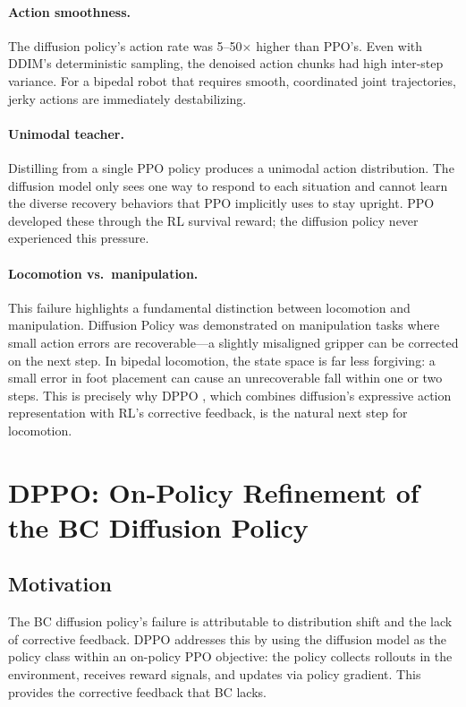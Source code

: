 \documentclass{article}
\begin{document}
\paragraph{Action smoothness.}
The diffusion policy's action rate was 5--50$\times$ higher than PPO's. Even with DDIM's deterministic sampling, the denoised action chunks had high inter-step variance. For a bipedal robot that requires smooth, coordinated joint trajectories, jerky actions are immediately destabilizing.

\paragraph{Unimodal teacher.}
Distilling from a single PPO policy produces a unimodal action distribution. The diffusion model only sees one way to respond to each situation and cannot learn the diverse recovery behaviors that PPO implicitly uses to stay upright. PPO developed these through the RL survival reward; the diffusion policy never experienced this pressure.

\paragraph{Locomotion vs.\ manipulation.}
This failure highlights a fundamental distinction between locomotion and manipulation. Diffusion Policy was demonstrated on manipulation tasks where small action errors are recoverable---a slightly misaligned gripper can be corrected on the next step. In bipedal locomotion, the state space is far less forgiving: a small error in foot placement can cause an unrecoverable fall within one or two steps. This is precisely why DPPO \citep{ren2024dppo}, which combines diffusion's expressive action representation with RL's corrective feedback, is the natural next step for locomotion.


\section{DPPO: On-Policy Refinement of the BC Diffusion Policy}
\label{sec:dppo}

\subsection{Motivation}

The BC diffusion policy's failure is attributable to distribution shift and the lack of corrective feedback. DPPO \citep{ren2024dppo} addresses this by using the diffusion model as the policy class within an on-policy PPO objective: the policy collects rollouts in the environment, receives reward signals, and updates via policy gradient. This provides the corrective feedback that BC lacks.
\end{document}
